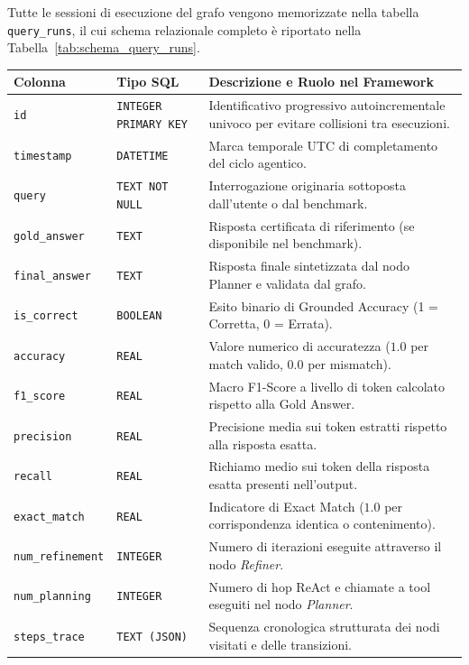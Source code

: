 Tutte le sessioni di esecuzione del grafo vengono memorizzate nella tabella \texttt{query\_runs}, il cui schema relazionale completo è riportato nella Tabella~\ref{tab:schema_query_runs}.

\begin{table}[htbp]
\centering
\small
\begin{tabularx}{\textwidth}{l p{3.2cm} X}
\toprule
\textbf{Colonna} & \textbf{Tipo SQL} & \textbf{Descrizione e Ruolo nel Framework} \\
\midrule
\texttt{id} & \texttt{INTEGER PRIMARY KEY} & Identificativo progressivo autoincrementale univoco per evitare collisioni tra esecuzioni. \\
\texttt{timestamp} & \texttt{DATETIME} & Marca temporale UTC di completamento del ciclo agentico. \\
\texttt{query} & \texttt{TEXT NOT NULL} & Interrogazione originaria sottoposta dall'utente o dal benchmark. \\
\texttt{gold\_answer} & \texttt{TEXT} & Risposta certificata di riferimento (se disponibile nel benchmark). \\
\texttt{final\_answer} & \texttt{TEXT} & Risposta finale sintetizzata dal nodo Planner e validata dal grafo. \\
\texttt{is\_correct} & \texttt{BOOLEAN} & Esito binario di Grounded Accuracy (1 = Corretta, 0 = Errata). \\
\texttt{accuracy} & \texttt{REAL} & Valore numerico di accuratezza ($1.0$ per match valido, $0.0$ per mismatch). \\
\texttt{f1\_score} & \texttt{REAL} & Macro F1-Score a livello di token calcolato rispetto alla Gold Answer. \\
\texttt{precision} & \texttt{REAL} & Precisione media sui token estratti rispetto alla risposta esatta. \\
\texttt{recall} & \texttt{REAL} & Richiamo medio sui token della risposta esatta presenti nell'output. \\
\texttt{exact\_match} & \texttt{REAL} & Indicatore di Exact Match ($1.0$ per corrispondenza identica o contenimento). \\
\texttt{num\_refinement} & \texttt{INTEGER} & Numero di iterazioni eseguite attraverso il nodo \textit{Refiner}. \\
\texttt{num\_planning} & \texttt{INTEGER} & Numero di hop ReAct e chiamate a tool eseguiti nel nodo \textit{Planner}. \\
\texttt{steps\_trace} & \texttt{TEXT (JSON)} & Sequenza cronologica strutturata dei nodi visitati e delle transizioni. \\

\end{tabularx}
\end{table}
